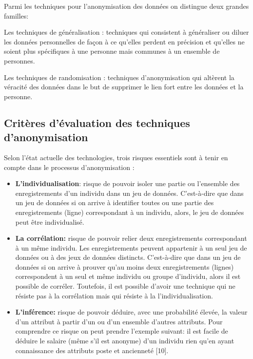Parmi les techniques pour l’anonymisation des données on distingue deux grandes familles:  

Les techniques de généralisation : techniques qui consistent à généraliser ou diluer les données personnelles de façon à ce qu’elles perdent en précision et qu’elles ne soient plus spécifiques à une personne mais communes à un ensemble de personnes. 

Les techniques de randomisation :  techniques d’anonymisation qui altèrent la véracité des données dans le but de supprimer le lien fort entre les données et la personne. 

\subsection{Critères d’évaluation des techniques d’anonymisation}

Selon l’état actuelle des technologies, trois risques essentiels sont à tenir en compte dans le processus d’anonymisation :  

\begin{itemize}
 
    \item \textbf{L’individualisation}: risque de pouvoir isoler une partie ou l’ensemble des enregistrements d’un individu dans un jeu de données. C’est-à-dire que dans un jeu de données si on arrive à identifier toutes ou une partie des enregistrements (ligne) correspondant à un individu, alors, le jeu de données peut être individualisé. 

    \item \textbf{La corrélation:} risque de pouvoir relier deux enregistrements correspondant à un même individu. Les enregistrements peuvent appartenir à un seul jeu de données ou à des jeux de données distincts. C’est-à-dire que dans un jeu de données si on arrive à prouver qu’au moins deux enregistrements (lignes) correspondent à un seul et même individu ou groupe d’individu, alors il est possible de corréler. Toutefois, il est possible d’avoir une technique qui ne résiste pas à la corrélation mais qui résiste à la l’individualisation.  

    \item \textbf{L’inférence:} risque de pouvoir déduire, avec une probabilité élevée, la valeur d’un attribut à partir d’un ou d’un ensemble d’autres attributs. Pour comprendre ce risque on peut prendre l’exemple suivant: il est facile de déduire le salaire (même s’il est anonyme) d’un individu rien qu’en ayant connaissance des attributs poste et ancienneté [10]. 
\end{itemize}
